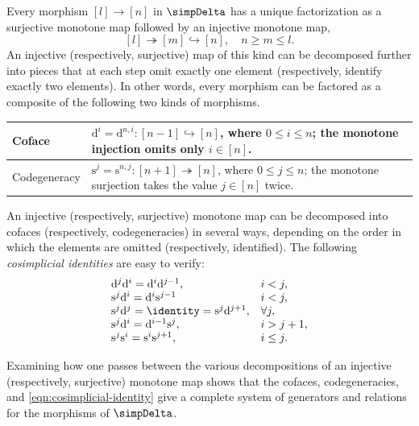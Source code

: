 Every morphism $[l]\to[n]$ in $\simpDelta$ has a unique factorization as a
surjective monotone map followed by an injective monotone map,
\[ [l] \twoheadrightarrow [m] \hookrightarrow [n], \quad n \geq m \leq l. \]
An injective (respectively, surjective) map of this kind can be decomposed
further into pieces that at each step omit exactly one element (respectively,
identify exactly two elements). In other words, every morphism can be
factored as a composite of the following two kinds of morphisms.
\begin{center}\begin{tabular}{|l|p{}|} \hline
	Coface & $\mathrm{d}^i=\mathrm{d}^{n,i}:[n-1]\hookrightarrow[n]$, where
	$0\leq i\leq n$; the monotone injection omits only $i\in[n]$. \\ \hline
	Codegeneracy & $\mathrm{s}^j=\mathrm{s}^{n,j}:[n+1]\twoheadrightarrow[n]$,
	where $0\leq j\leq n$; the monotone surjection takes the value $j\in[n]$
	twice. \\ \hline
\end{tabular}\end{center}

An injective (respectively, surjective) monotone map can be decomposed into
cofaces (respectively, codegeneracies) in several ways, depending on the
order in which the elements are omitted (respectively, identified). The
following \emph{cosimplicial identities} are easy to verify:
\begin{equation}\label{eqn:cosimplicial-identity}\begin{array}{ll}
	\mathrm{d}^j \mathrm{d}^i = \mathrm{d}^i \mathrm{d}^{j-1}, & i < j, \\
	\mathrm{s}^j \mathrm{d}^i = \mathrm{d}^i \mathrm{s}^{j-1} & i < j, \\
	\mathrm{s}^j \mathrm{d}^j = \identity = \mathrm{s}^j \mathrm{d}^{j+1}, & \forall j, \\
	\mathrm{s}^j \mathrm{d}^i = \mathrm{d}^{i-1} \mathrm{s}^j, & i > j+1, \\
	\mathrm{s}^j \mathrm{s}^i = \mathrm{s}^i \mathrm{s}^{j+1}, & i \leq j.
\end{array}\end{equation}

Examining how one passes between the various decompositions of an injective
(respectively, surjective) monotone map shows that the cofaces,
codegeneracies, and \eqref{eqn:cosimplicial-identity} give a complete system
of generators and relations for the morphisms of $\simpDelta$.

